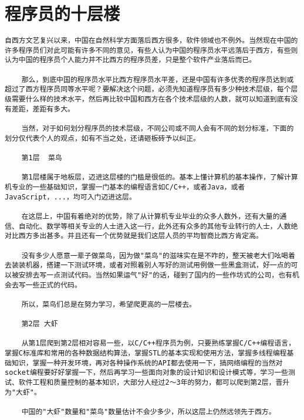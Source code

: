 
\section{程序员的十层楼}
\begin{verbatim}
自西方文艺复兴以来，中国在自然科学方面落后西方很多，软件领域也不例外。当然现在中国的许多程序员们对此可能有许多不同的意见，有些人认为中国的程序员水平远落后于西方，有些则认为中国的程序员个人能力并不比西方的程序员差，只是整个软件产业落后而已。

    那么，到底中国的程序员水平比西方程序员水平差，还是中国有许多优秀的程序员达到或超过了西方程序员同等水平呢？要解决这个问题，必须先知道程序员有多少种技术层级，每个层级需要什么样的技术水平，然后再比较中国和西方在各个技术层级的人数，就可以知道到底有没有差距，差距有多大。

    当然，对于如何划分程序员的技术层级，不同公司或不同人会有不同的划分标准，下面的划分仅代表个人的观点，如有不当之处，还请砸板砖予以纠正。

    第1层  菜鸟

    第1层楼属于地板层，迈进这层楼的门槛是很低的。基本上懂计算机的基本操作，了解计算机专业的一些基础知识，掌握一门基本的编程语言如C/C++，或者Java，或者JavaScript，...，均可入门迈进这层。

    在这层上，中国有着绝对的优势，除了从计算机专业毕业的众多人数外，还有大量的通信、自动化、数学等相关专业的人士进入这一行，此外还有众多的其他专业转行的人士，人数绝对比西方多出甚多。并且还有一个优势就是我们这层人员的平均智商比西方肯定高。

    没有多少人愿意一辈子做菜鸟，因为做"菜鸟"的滋味实在是不咋的，整天被老大们吆喝着去装装机器，搭建一下测试环境，或者对照着别人写好的测试用例做一些黑盒测试，好一点的可以被安排去写一点测试代码。当然如果运气"好"的话，碰到了国内的一些作坊式的公司，也有机会去写一些正式的代码。

    所以，菜鸟们总是在努力学习，希望爬更高的一层楼去。

    第2层 大虾

    从第1层爬到第2层相对容易一些，以C/C++程序员为例，只要熟练掌握C/C++编程语言，掌握C标准库和常用的各种数据结构算法，掌握STL的基本实现和使用方法，掌握多线程编程基础知识，掌握一种开发环境，再对各种操作系统的API都去使用一下，搞网络编程的当然对socket编程要好好掌握一下，然后再学习一些面向对象的设计知识和设计模式等，学习一些测试、软件工程和质量控制的基本知识，大部分人经过2～3年的努力，都可以爬到第2层，晋升为"大虾"。

    中国的"大虾"数量和"菜鸟"数量估计不会少多少，所以这层上仍然远领先于西方。


\end{verbatim}
